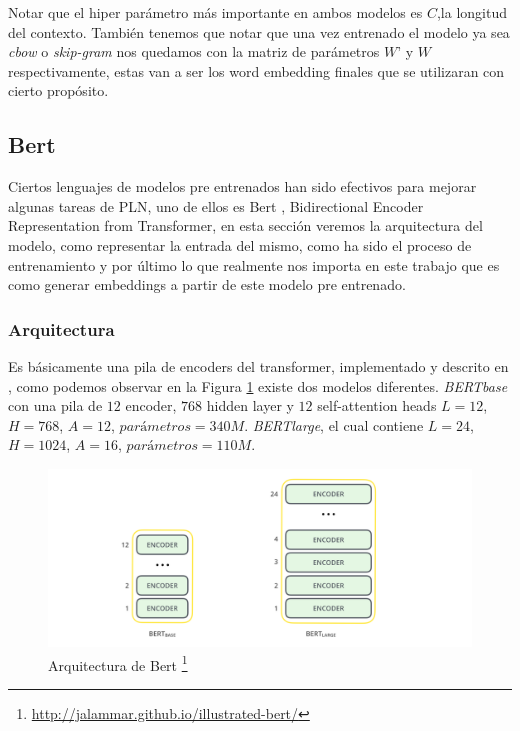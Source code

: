 Notar que el hiper parámetro más importante en ambos modelos es $C$,la longitud del contexto. También tenemos que notar que una vez entrenado el modelo ya sea \textit{cbow} o \textit{skip-gram} nos quedamos con la matriz de parámetros $W’$ y $W$ respectivamente, estas van a ser los word embedding finales que se utilizaran con cierto propósito.

\subsection{Bert} \label{sec:bert}

Ciertos lenguajes de modelos pre entrenados han sido efectivos para mejorar algunas tareas de PLN, uno de ellos es Bert \cite{devlin2018bert}, Bidirectional Encoder Representation from Transformer, en esta sección veremos la arquitectura del modelo, como representar la entrada del mismo, como ha sido el proceso de entrenamiento y por último lo que realmente nos importa en este trabajo que es como generar embeddings a partir de este modelo pre entrenado.

\subsubsection{Arquitectura}

Es básicamente una pila de encoders del transformer, implementado y descrito en \cite{DBLP:journals/corr/VaswaniSPUJGKP17} , como podemos observar en la Figura \ref{fig:bert_arch} existe dos modelos diferentes. \textit{BERTbase} con una pila de $12$ encoder, $768$ hidden layer y $12$ self-attention heads $L=12$, $H=768$, $A=12$, $parámetros = 340M$. \textit{BERTlarge}, el cual contiene $L=24$, $H=1024$, $A=16$, $parámetros=110M$.

\begin{figure}
\begin{center}
    \includegraphics[width=\textwidth]{images/image209.png}
    \caption{Arquitectura de Bert \footnote{\url{http://jalammar.github.io/illustrated-bert/}}}
    \label{fig:bert_arch}
\end{center}
\end{figure}


